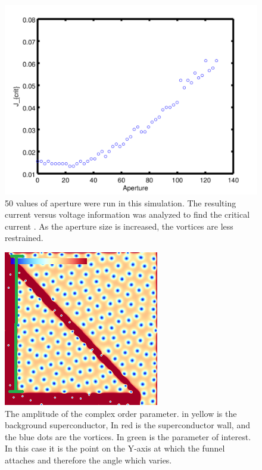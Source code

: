 \begin{figure}[htbp]
\begin{center}
\includegraphics[scale=.50]{oneSideX.png}
\caption{ 50 values of aperture were run in this simulation. The resulting current versus voltage information was analyzed to find the critical current . As the aperture size is increased, the vortices are less restrained. }
\label{normalYscan}
\end{center}
\end{figure}

\begin{figure}[htbp]
\begin{center}
\includegraphics[scale=.50]{oneSidedY.png}
\caption{ The amplitude of the complex order parameter. in yellow is the background superconductor, In red is the superconductor wall, and the blue dots are the vortices. In green is the parameter of interest. In this case it is the point on the Y-axis at which the funnel attaches and therefore the angle which varies.}
\label{oneSidedY}
\end{center}
\end{figure}

